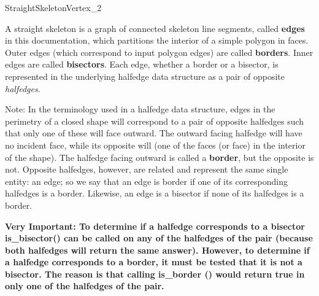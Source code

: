 
\begin{ccRefConcept}{StraightSkeletonVertex_2}



A straight skeleton is a graph of connected skeleton line segments, called \textbf{edges} in this documentation, which partitions the interior of a simple polygon in faces. Outer edges (which correspond to input polygon edges) are called \textbf{borders}. Inner edges are called \textbf{bisectors}. Each edge, whether a border or a bisector, is represented in the underlying halfedge data structure as a pair of opposite \textit{halfedges}.

Note: In the terminology used in a halfedge data structure, edges in the perimetry of a closed shape will correspond to a pair of opposite halfedges such that only one of these will face outward. The outward facing halfedge will have no incident face, while its opposite will (one of the faces (or face) in the interior of the shape). The halfedge facing outward is called a \textbf{border}, but the opposite is not. Opposite halfedges, however, are related and represent the same single entity: an edge; so we say that an edge is border if one of its corresponding halfedges is a border. Likewise, an edge is a bisector if none of its halfedges is a border.

\textbf{Very Important: To determine if a halfedge corresponds to a bisector is\_bisector() can be called on any of the halfedges of the pair (because both halfedges will return the same answer). However, to determine if a halfedge corresponds to a border, it must be tested that it is not a bisector. The reason is that calling is\_border () would return true in only one of the halfedges of the pair.}


\end{ccRefConcept}
